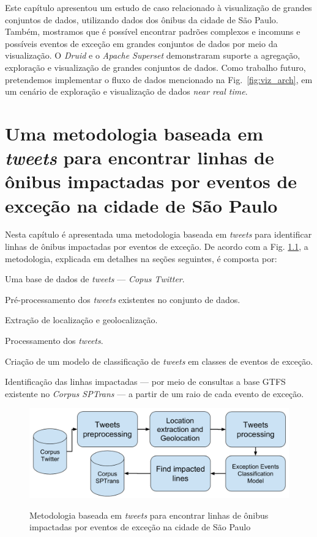 \documentclass[
	12pt,				%
	oneside,			%
	a4paper,			%
	english,			%
	brazil				%
	]{abntex2ppgsi}
\begin{document}
Este capítulo apresentou um estudo de caso relacionado à visualização de grandes conjuntos de dados, utilizando dados dos ônibus da cidade de São Paulo. Também, mostramos que é possível encontrar padrões complexos e incomuns e possíveis eventos de exceção em grandes conjuntos de dados por meio da visualização. O \textit{Druid} e o \textit{Apache Superset} demonstraram suporte a agregação, exploração e visualização de grandes conjuntos de dados. Como trabalho futuro, pretendemos implementar o fluxo de dados mencionado na Fig.~\ref{fig:viz_arch}, em um cenário de exploração e visualização de dados \textit{near real time}.


\chapter{Uma metodologia baseada em \textit{tweets} para encontrar linhas de ônibus impactadas por eventos de exceção na cidade de São Paulo}
\label{exp1}

Nesta capítulo é apresentada uma metodologia baseada em \textit{tweets} para identificar linhas de ônibus impactadas por eventos de exceção. De acordo com a Fig. \ref{fig:tweet_based_methodology}, a metodologia, explicada em detalhes na seções seguintes, é composta por:
\begin{enumerate*}
\item Uma base de dados de \textit{tweets} --- \textit{Copus Twitter}.
\item Pré-processamento dos \textit{tweets} existentes no conjunto de dados.
\item Extração de localização e geolocalização.
\item Processamento dos \textit{tweets}.
\item Criação de um modelo de classificação de \textit{tweets} em classes de eventos de exceção.
\item Identificação das linhas impactadas --- por meio de consultas a base GTFS existente no \textit{Corpus SPTrans} --- a partir de um raio de cada evento de exceção.
\end{enumerate*}

\begin{figure}[!htb]
	\centering
 	  \caption{Metodologia baseada em \textit{tweets} para encontrar linhas de ônibus impactadas por eventos de exceção na cidade de São Paulo}
		\includegraphics[width=0.7\linewidth]{images/tweet_based_methodology.png}
	\label{fig:tweet_based_methodology}
\end{figure}
\end{document}
